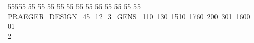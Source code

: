 %
%
\begin{tabbing}
55555 \= 55 \= 55 \= 55 \= 55 \= 55 \= 55 \= 55 \= 55 \= 55 \= 55 \= 55 \= 55 \= \>PRAEGER\_DESIGN\_45\_12\_3\_GENS=110\ 130\ 1510\ 1760\ 200\ 301\ 1600\ \\[0pt]
01\\[0pt]
2\>\end{tabbing}
